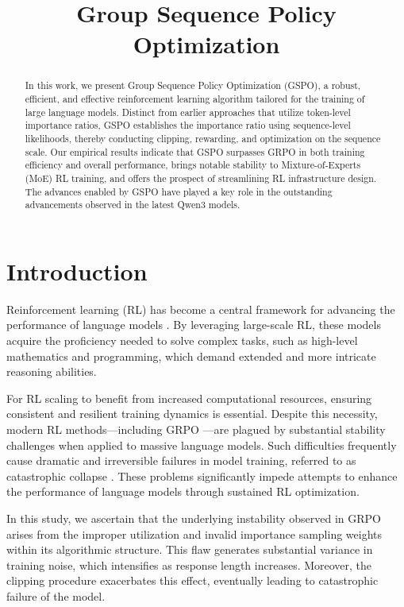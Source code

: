 \title{Group Sequence Policy Optimization}

\begin{abstract}
In this work, we present Group Sequence Policy Optimization (GSPO), a robust, efficient, and effective reinforcement learning algorithm tailored for the training of large language models. Distinct from earlier approaches that utilize token-level importance ratios, GSPO establishes the importance ratio using sequence-level likelihoods, thereby conducting clipping, rewarding, and optimization on the sequence scale. Our empirical results indicate that GSPO surpasses GRPO in both training efficiency and overall performance, brings notable stability to Mixture-of-Experts (MoE) RL training, and offers the prospect of streamlining RL infrastructure design. The advances enabled by GSPO have played a key role in the outstanding advancements observed in the latest Qwen3 models.
\end{abstract}

\section{Introduction}
\label{sec:intro}

Reinforcement learning (RL) has become a central framework for advancing the performance of language models \citep{o1,dpsk-r1,qwq32b,qwen3}. By leveraging large-scale RL, these models acquire the proficiency needed to solve complex tasks, such as high-level mathematics and programming, which demand extended and more intricate reasoning abilities.

For RL scaling to benefit from increased computational resources, ensuring consistent and resilient training dynamics is essential. Despite this necessity, modern RL methods—including GRPO \citep{grpo}—are plagued by substantial stability challenges when applied to massive language models. Such difficulties frequently cause dramatic and irreversible failures in model training, referred to as catastrophic collapse \citep{qwen3, minimax-m1}. These problems significantly impede attempts to enhance the performance of language models through sustained RL optimization.

In this study, we ascertain that the underlying instability observed in GRPO arises from the improper utilization and invalid importance sampling weights within its algorithmic structure. This flaw generates substantial variance in training noise, which intensifies as response length increases. Moreover, the clipping procedure exacerbates this effect, eventually leading to catastrophic failure of the model.

